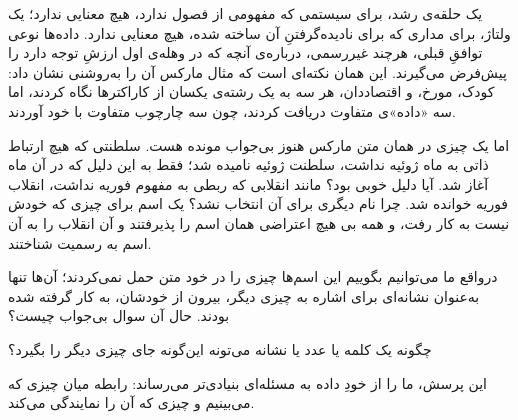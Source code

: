 یک حلقه‌ی رشد، برای سیستمی که مفهومی از فصول ندارد، هیچ معنایی ندارد؛ یک ولتاژ، برای مداری که برای نادیده‌گرفتنِ آن ساخته شده، هیچ معنایی ندارد. داده‌ها نوعی توافقِ قبلی، هرچند غیررسمی، درباره‌ی آنچه که در وهله‌ی اول ارزشِ توجه دارد را پیش‌فرض می‌گیرند. این همان نکته‌ای است که مثال مارکس آن را به‌روشنی نشان داد: کودک، مورخ، و اقتصاددان، هر سه به یک رشته‌ی یکسان از کاراکترها نگاه کردند، اما سه «داده»ی متفاوت دریافت کردند، چون سه چارچوب متفاوت با خود آوردند.

اما یک چیزی در همان متن مارکس هنوز بی‌جواب مونده هست. سلطنتی که هیچ ارتباط ذاتی به ماه ژوئیه نداشت، سلطنت ژوئیه نامیده شد؛ فقط به این دلیل که در آن ماه آغاز شد. آیا دلیل خوبی بود؟ مانند انقلابی که ربطی به مفهوم فوریه نداشت، انقلاب فوریه خوانده شد. چرا نام دیگری برای آن انتخاب نشد؟ یک اسم برای چیزی که خودش نیست به کار رفت، و همه بی هیچ اعتراضی همان اسم را پذیرفتند و آن انقلاب را به آن اسم به رسمیت شناختند.

درواقع ما می‌توانیم بگوییم این اسم‌ها چیزی را در خود متن حمل نمی‌کردند؛ آن‌ها تنها به‌عنوان نشانه‌ای برای اشاره به چیزی دیگر، بیرون از خودشان، به کار گرفته شده بودند. حال آن سوال بی‌جواب چیست؟

چگونه یک کلمه یا عدد یا نشانه می‌تونه این‌گونه جای چیزی دیگر را بگیرد؟ 

این پرسش، ما را از خودِ داده به مسئله‌ای بنیادی‌تر می‌رساند: رابطه میان چیزی که می‌بینیم و چیزی که آن را نمایندگی می‌کند.
